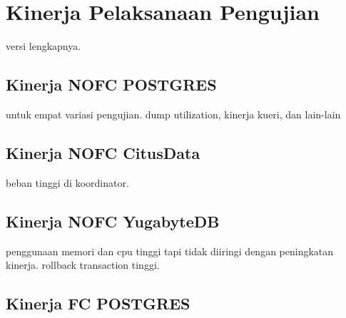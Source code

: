 \chapter{Kinerja Pelaksanaan Pengujian}
\label{apx:test-run-performance}

versi lengkapnya.

\section{Kinerja NOFC POSTGRES}

untuk empat variasi pengujian. dump utilization, kinerja kueri, dan lain-lain

\section{Kinerja NOFC CitusData}

beban tinggi di koordinator.

\section{Kinerja NOFC YugabyteDB}

penggunaan memori dan cpu tinggi tapi tidak diiringi dengan peningkatan kinerja. rollback transaction tinggi.

\section{Kinerja FC POSTGRES}